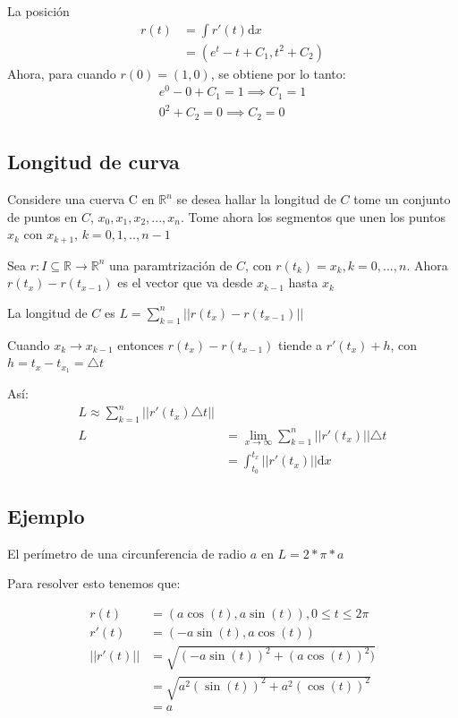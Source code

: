\documentclass{article}
\newcommand{\field}[1]{\mathbb{#1}}
\newcommand{\R}{\field{R}}
\begin{document}
La posición
\begin{align}
	r(t) & = \int r'(t) \mathrm{d}x \\
	     & = (e^t-t+C_1, t^2+C_2)
\end{align}
Ahora, para cuando $ r(0) = (1, 0) $, se obtiene por lo tanto:
\begin{align}
	e^0 - 0 + C_1 = 1 \implies C_1 = 1 \\
	0^2 + C_2 = 0 \implies C_2 = 0
\end{align}

\subsection*{Longitud de curva}

Considere una cuerva C en $ \R^n $ se desea hallar la longitud de $ C $ tome un
conjunto de puntos en $ C $, $x_0, x_1, x_2, ..., x_n$. Tome ahora los segmentos
que unen los puntos $ x_k $ con $ x_{k + 1} $, $ k = 0, 1, .., n - 1 $

Sea $ r:I \subseteq \R \longrightarrow \R^{n} $ una paramtrización de $ C $, con
$ r(t_k) = x_k, k = 0 , ... , n$. Ahora $r(t_x) - r(t_{x - 1})$ es el vector que
va desde $x_{k - 1}$ hasta $x_{k}$

La longitud de $ C $ es $ L = \sum_{k=1}^{n}||r(t_x) - r(t_{x - 1})||$

Cuando $ x_k \longrightarrow x_{k-1} $ entonces $r(t_x) - r(t_{x - 1}) $ tiende
a $ r'(t_x) + h $, con $ h = t_x-t_{x_1} = \triangle t $

Así:
\begin{align}
	L \approx \sum_{k=1}^{n}||r'(t_x) \triangle t||                       \\
	L & = \lim_{x\rightarrow\infty} \sum_{k=1}^{n}||r'(t_x)|| \triangle t \\
	  & = \int_{t_0}^{t_x} ||r'(t_x)|| \mathrm{d}x
\end{align}

\subsection*{Ejemplo}

El perímetro de una circunferencia de radio $a$ en $ L = 2*\pi*a $

Para resolver esto tenemos que:

\begin{align}
	r(t)        & = (a\cos(t), a\sin(t)), 0 \leq t \leq 2\pi \\
	r'(t)       & = (-a\sin(t), a\cos(t))                    \\
	|| r'(t) || & = \sqrt{(-a\sin(t))^2 + (a\cos(t))^2)}     \\
	            & = \sqrt{a^2(\sin(t))^2 + a^2(\cos(t))^2}   \\
	            & = a
\end{align}
\end{document}
